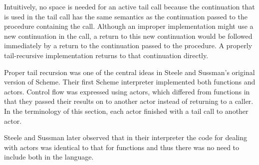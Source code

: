 \begin{rationale}

Intuitively, no space is needed for an active tail call because the
continuation that is used in the tail call has the same semantics as the
continuation passed to the procedure containing the call.  Although an improper
implementation might use a new continuation in the call, a return
to this new continuation would be followed immediately by a return
to the continuation passed to the procedure.  A properly tail-recursive
implementation returns to that continuation directly.

Proper tail recursion was one of the central ideas in Steele and
Sussman's original version of Scheme.  Their first Scheme interpreter
implemented both functions and actors.  Control flow was expressed using
actors, which differed from functions in that they passed their results
on to another actor instead of returning to a caller.  In the terminology
of this section, each actor finished with a tail call to another actor.

Steele and Sussman later observed that in their interpreter the code
for dealing with actors was identical to that for functions and thus
there was no need to include both in the language.

\end{rationale}

